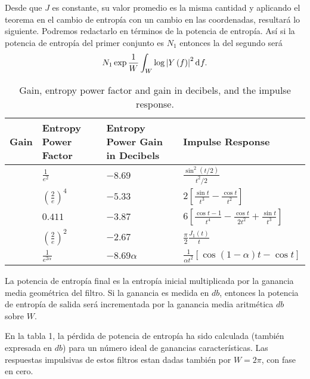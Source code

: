 Desde que $J$ es constante, su valor promedio es la misma cantidad y
aplicando el teorema en el cambio de entrop\'ia con un cambio en las
coordenadas, resultar\'a lo siguiente. Podremos redactarlo en
t\'erminos de la potencia de entrop\'ia. As\'i si la potencia de
entrop\'ia del primer conjunto es $N_{1}$ entonces la del segundo
ser\'a
\begin{equation}
N_{1}\exp \frac{1}{W}\int_{W}^{\:}\log \left | Y\left ( f \right )
\right |^{2} \diff f.
\end{equation}

\begin{table}[!ht]
\caption{Gain, entropy power factor and gain in decibels, and the impulse response.}
\label{table1}
\begin{center}
\begin{tabular}{|m{1mm}m{50mm}|m{20mm}|m{25mm}|m{35mm}|}
\hline
\multicolumn{2}{|c|}{\sc Gain} & {\sc Entropy Power Factor} & {\sc Entropy Power Gain in Decibels} & {\sc Impulse Response} \\
\hline
&  & $\frac{1}{e^2}$ & $-8.69$ & $\frac{\sin^2(t/2)}{t^2 / 2}$ \\
\hline
&  & $\left (\frac{2}{e}  \right )^{4}$ & $-5.33$ & $2\left [ \frac{\sin t}{t^3} - \frac{\cos t}{t^2} \right ]$ \\
\hline
&  & $0.411$ & $-3.87$ & $6\left [ \frac{\cos t - 1}{t^4} - \frac{\cos t}{2t^2} + \frac{\sin t}{t^3} \right ]$ \\
\hline
&  & $\left (\frac{2}{e}  \right )^{2}$ & $-2.67$ & $\frac{\pi }{2} \frac{J_{1}\left ( t \right )}{t}$ \\
\hline
&  & $\frac{1}{e^{2\alpha}}$ & $-8.69\alpha$ & $\frac{1}{\alpha t^{2}} \left[ \cos \left( 1 - \alpha \right) t - \cos t \right]$ \\
\hline
\end{tabular}
\end{center}
\end{table}

La potencia de entrop\'ia final es la entrop\'ia inicial multiplicada
por la ganancia media geom\'etrica del filtro. Si la ganancia es
medida en $db$, entonces la potencia de entrop\'ia de salida ser\'a
incrementada por la ganancia media aritm\'etica $db$ sobre $W$.

En la tabla 1, la p\'erdida de potencia de entrop\'ia ha sido
calculada (tambi\'en expresada en $db$) para un n\'umero ideal de
ganancias caracter\'isticas. Las respuestas impulsivas de estos
filtros estan dadas tambi\'en por $W = 2 \pi$, con fase en cero.

